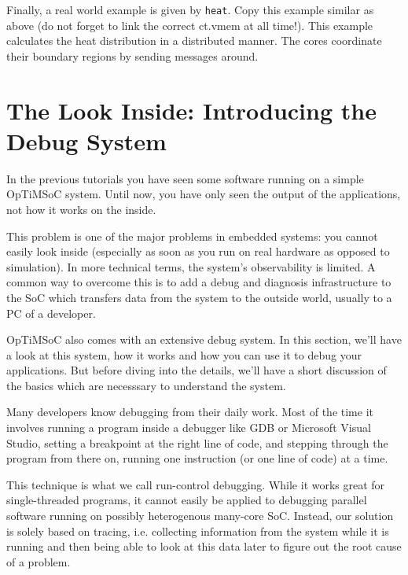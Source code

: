 Finally, a real world example is given by \verb|heat|. Copy this
example similar as above (do not forget to link the correct ct.vmem at
all time!). This example calculates the heat distribution in a
distributed manner. The cores coordinate their boundary regions by
sending messages around.

%
%

\section{The Look Inside: Introducing the Debug System}

In the previous tutorials you have seen some software running on a simple
OpTiMSoC system. Until now, you have only seen the output of the applications,
not how it works on the inside.

This problem is one of the major problems in embedded systems: you cannot
easily look inside (especially as soon as you run on real hardware as opposed
to simulation). In more technical terms, the system's observability is
limited. A common way to overcome this is to add a debug and diagnosis
infrastructure to the SoC which transfers data from the system to the outside
world, usually to a PC of a developer.

OpTiMSoC also comes with an extensive debug system. In this section, we'll have
a look at this system, how it works and how you can use it to debug your
applications. But before diving into the details, we'll have a short discussion
of the basics which are necesssary to understand the system.

Many developers know debugging from their daily work. Most of the time it
involves running a program inside a debugger like GDB or Microsoft Visual
Studio, setting a breakpoint at the right line of code, and stepping through the
program from there on, running one instruction (or one line of code) at a time.

This technique is what we call run-control debugging. While it works great for
single-threaded programs, it cannot easily be applied to debugging parallel
software running on possibly heterogenous many-core SoC. Instead, our solution
is solely based on tracing, i.e. collecting information from the system while
it is running and then being able to look at this data later to figure out the
root cause of a problem.

